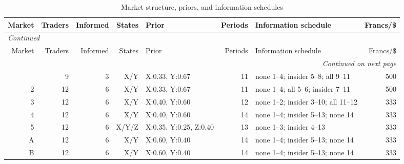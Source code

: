 \footnotesize
\begin{longtable}{rrrrlrp{4.9cm}r}
\caption{Market structure, priors, and information schedules}\label{tab:app-market-structure}\\
\toprule
Market & Traders & Informed & States & Prior & Periods & Information schedule & Francs/\$ \\
\midrule
\endfirsthead
\multicolumn{8}{l}{\textit{Continued}}\\
\toprule
Market & Traders & Informed & States & Prior & Periods & Information schedule & Francs/\$ \\
\midrule
\endhead
\midrule
\multicolumn{8}{r}{\textit{Continued on next page}}\\
\endfoot
\bottomrule
\endlastfoot
1 & 9 & 3 & X/Y & X:0.33, Y:0.67 & 11 & none 1--4; insider 5--8; all 9--11 & 500 \\
2 & 12 & 6 & X/Y & X:0.33, Y:0.67 & 11 & none 1--4; all 5--6; insider 7--11 & 500 \\
3 & 12 & 6 & X/Y & X:0.40, Y:0.60 & 12 & none 1--2; insider 3--10; all 11--12 & 333 \\
4 & 12 & 6 & X/Y & X:0.40, Y:0.60 & 14 & none 1--4; insider 5--13; none 14 & 333 \\
5 & 12 & 6 & X/Y/Z & X:0.35, Y:0.25, Z:0.40 & 13 & none 1--3; insider 4--13 & 333 \\
A & 12 & 6 & X/Y & X:0.60, Y:0.40 & 14 & none 1--4; insider 5--13; none 14 & 333 \\
B & 12 & 6 & X/Y & X:0.60, Y:0.40 & 14 & none 1--4; insider 5--13; none 14 & 333 \\
\end{longtable}
